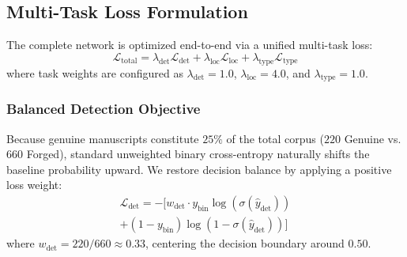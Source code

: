 \documentclass[pdflatex,sn-mathphys-num,iicol]{sn-jnl}
\begin{document}
\subsection{Multi-Task Loss Formulation}\label{subsec4_5}
The complete network is optimized end-to-end via a unified multi-task loss:
\begin{equation}
\mathcal{L}_{\text{total}} = \lambda_{\text{det}} \mathcal{L}_{\text{det}} + \lambda_{\text{loc}} \mathcal{L}_{\text{loc}} + \lambda_{\text{type}} \mathcal{L}_{\text{type}}\label{eq_loss_total}
\end{equation}
where task weights are configured as $\lambda_{\text{det}} = 1.0$, $\lambda_{\text{loc}} = 4.0$, and $\lambda_{\text{type}} = 1.0$.

\subsubsection{Balanced Detection Objective}
Because genuine manuscripts constitute $25\%$ of the total corpus ($220$ Genuine vs. $660$ Forged), standard unweighted binary cross-entropy naturally shifts the baseline probability upward. We restore decision balance by applying a positive loss weight:
\begin{align}
\mathcal{L}_{\text{det}} = - \Big[ w_{\text{det}} \cdot y_{\text{bin}} \log(\sigma(\hat{y}_{\text{det}})) \nonumber \\
+ (1 - y_{\text{bin}}) \log(1 - \sigma(\hat{y}_{\text{det}})) \Big]\label{eq_loss_det}
\end{align}
where $w_{\text{det}} = 220 / 660 \approx 0.33$, centering the decision boundary around $0.50$.
\end{document}

